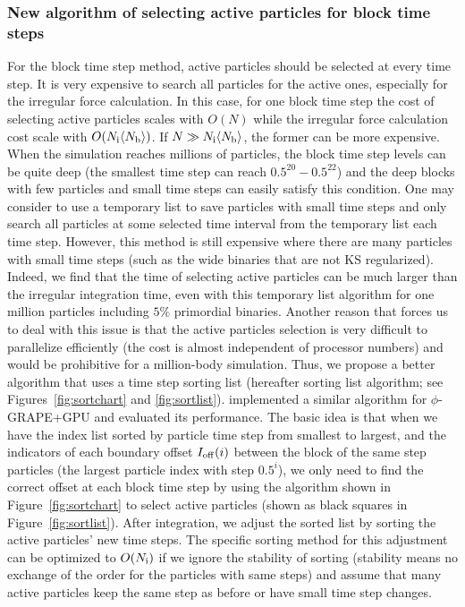 \documentclass[usenatbib,aas_macros]{mn2e}
\begin{document}
\subsubsection{New algorithm of selecting active particles for block time steps}
\label{sec:initb}

For the block time step method, active particles should be selected at every time step. 
It is very expensive to search all particles for the active ones, especially for the irregular force calculation. 
In this case, for one block time step the cost of selecting active particles scales with $O(N)$ while the irregular force calculation cost scale with $O(N_{\rm i} \langle N_{\rm b} \rangle)$. 
If $N \gg N_{\rm i} \langle N_{\rm b} \rangle$, the former can be more expensive.
When the simulation reaches millions of particles, the block time step levels can be quite deep (the smallest time step can reach $0.5^{20}-0.5^{22}$) and the deep blocks with few particles and small time steps can easily satisfy this condition. 
One may consider to use a temporary list to save particles with small time steps and only search all particles at some selected time interval from the temporary list each time step.
However, this method is still expensive where there are many particles with small time steps (such as the wide binaries that are not KS regularized). 
Indeed, we find that the time of selecting active particles can be much larger than the irregular integration time, even with this temporary list algorithm for one million particles including $5\%$ primordial binaries. 
Another reason that forces us to deal with this issue is that the active particles selection is very difficult to parallelize efficiently (the cost is almost independent of processor numbers) and would be prohibitive for a million-body simulation.
Thus, we propose a better algorithm that uses a time step sorting list (hereafter sorting list algorithm; see Figures~\ref{fig:sortchart} and \ref{fig:sortlist}). 
\cite{Zhong2014} implemented a similar algorithm for $\phi$-GRAPE+GPU and evaluated its performance.
The basic idea is that when we have the index list sorted by particle time step from smallest to largest, and the indicators of each boundary offset $I_{\rm off}(i)$ between the block of the same step particles (the largest particle index with step $0.5^i$), 
we only need to find the correct offset at each block time step by using the algorithm shown in Figure~\ref{fig:sortchart} to select active particles (shown as black squares in Figure~\ref{fig:sortlist}). 
After integration, we adjust the sorted list by sorting the active particles' new time steps.
The specific sorting method for this adjustment can be optimized to $O(N_{\rm i})$ 
if we ignore the stability of sorting (stability means no exchange of the order for the particles with same steps) and assume that many active particles keep the same step as before or have small time step changes.
\end{document}
